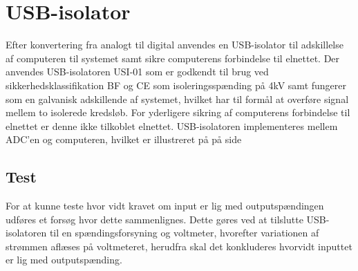 \section{USB-isolator}
Efter konvertering fra analogt til digital anvendes en USB-isolator til adskillelse af computeren til systemet samt sikre computerens forbindelse til elnettet. 
Der anvendes USB-isolatoren USI-01 som er godkendt til brug ved sikkerhedsklassifikation BF og CE som isoleringsspænding på 4kV samt fungerer som en galvanisk adskillende af systemet, hvilket har til formål at overføre signal mellem to isolerede kredsløb. For yderligere sikring af computerens forbindelse til elnettet er denne ikke tilkoblet elnettet. USB-isolatoren implementeres mellem ADC'en og computeren, hvilket er illustreret på  på side \pageref{blokdiagram}
\subsection{Test}
For at kunne teste hvor vidt kravet om input er lig med outputspændingen udføres et forsøg hvor dette sammenlignes. Dette gøres ved at tilslutte USB-isolatoren til en spændingsforsyning og voltmeter, hvorefter variationen af strømmen  aflæses på voltmeteret, herudfra skal det konkluderes hvorvidt inputtet er lig med outputspænding. 

